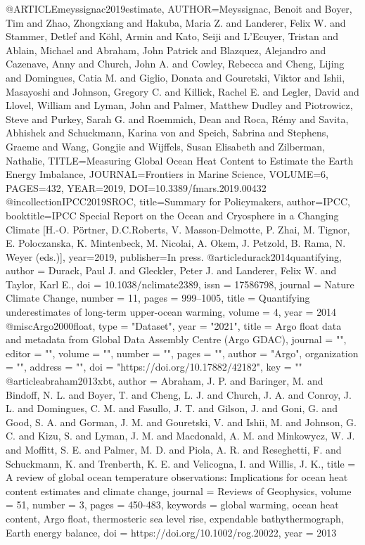 @ARTICLE{meyssignac2019estimate,
 AUTHOR={Meyssignac, Benoit and Boyer, Tim and Zhao, Zhongxiang and Hakuba, Maria Z. and Landerer, Felix W. and Stammer, Detlef and Köhl, Armin and Kato, Seiji and L’Ecuyer, Tristan and Ablain, Michael and Abraham, John Patrick and Blazquez, Alejandro and Cazenave, Anny and Church, John A. and Cowley, Rebecca and Cheng, Lijing and Domingues, Catia M. and Giglio, Donata and Gouretski, Viktor and Ishii, Masayoshi and Johnson, Gregory C. and Killick, Rachel E. and Legler, David and Llovel, William and Lyman, John and Palmer, Matthew Dudley and Piotrowicz, Steve and Purkey, Sarah G. and Roemmich, Dean and Roca, Rémy and Savita, Abhishek and Schuckmann, Karina von and Speich, Sabrina and Stephens, Graeme and Wang, Gongjie and Wijffels, Susan Elisabeth and Zilberman, Nathalie},
 TITLE={{Measuring Global Ocean Heat Content to Estimate the Earth Energy Imbalance}},
 JOURNAL={Frontiers in Marine Science},
 VOLUME={6},
 PAGES={432},
 YEAR={2019},
 DOI={10.3389/fmars.2019.00432}
}
@incollection{IPCC2019SROC,
 title={{Summary for Policymakers}},
 author={IPCC},
 booktitle={{IPCC Special Report on the Ocean and Cryosphere in a Changing Climate [H.-O. Pörtner, D.C.Roberts, V. Masson-Delmotte, P. Zhai, M. Tignor, E. Poloczanska, K. Mintenbeck, M. Nicolai, A. Okem, J. Petzold, B. Rama, N. Weyer (eds.)]}},
 year={2019},
 publisher={In press.}
}
@article{durack2014quantifying,
author = {Durack, Paul J. and Gleckler, Peter J. and Landerer, Felix W. and Taylor, Karl E.},
doi = {10.1038/nclimate2389},
issn = {17586798},
journal = {Nature Climate Change},
number = {11},
pages = {999--1005},
title = {{Quantifying underestimates of long-term upper-ocean warming}},
volume = {4},
year = {2014}
}
@misc{Argo2000float,
type = "Dataset",
year = "2021",
title = {{Argo float data and metadata from Global Data Assembly Centre (Argo GDAC)}},
journal = "",
editor = "",
volume = "",
number = "",
pages = "",
author = "Argo",
organization = "",
address = "",
doi = "https://doi.org/10.17882/42182",
key = ""
}
@article{abraham2013xbt,
author = {Abraham, J. P. and Baringer, M. and Bindoff, N. L. and Boyer, T. and Cheng, L. J. and Church, J. A. and Conroy, J. L. and Domingues, C. M. and Fasullo, J. T. and Gilson, J. and Goni, G. and Good, S. A. and Gorman, J. M. and Gouretski, V. and Ishii, M. and Johnson, G. C. and Kizu, S. and Lyman, J. M. and Macdonald, A. M. and Minkowycz, W. J. and Moffitt, S. E. and Palmer, M. D. and Piola, A. R. and Reseghetti, F. and Schuckmann, K. and Trenberth, K. E. and Velicogna, I. and Willis, J. K.},
title = {{A review of global ocean temperature observations: Implications for ocean heat content estimates and climate change}},
journal = {Reviews of Geophysics},
volume = {51},
number = {3},
pages = {450-483},
keywords = {global warming, ocean heat content, Argo float, thermosteric sea level rise, expendable bathythermograph, Earth energy balance},
doi = {https://doi.org/10.1002/rog.20022},
year = {2013}
}
